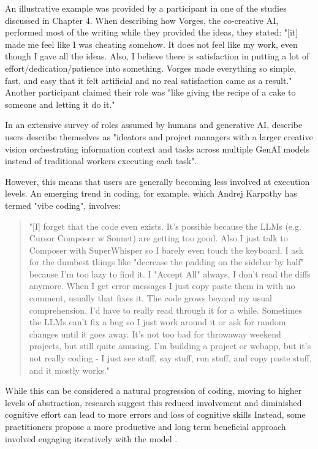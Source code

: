 An illustrative example was provided by a participant in one of the studies discussed in Chapter 4. When describing how Vorges, the co-creative AI, performed most of the writing while they provided the ideas, they stated: "[it] made me feel like I was cheating somehow. It does not feel like my work, even though I gave all the ideas. Also, I believe there is satisfaction in putting a lot of effort/dedication/patience into something. Vorges made everything so simple, fast, and easy that it felt artificial and no real satisfaction came as a result." Another participant claimed their role was "like giving the recipe of a cake to someone and letting it do it."


In an extensive survey of roles assumed by humans and generative AI, \cite{Palani2024-on} describe users describe themselves as "ideators and project managers with a larger creative vision orchestrating information context and tasks across multiple GenAI models instead of traditional workers executing each task". 

However, this means that users are generally becoming less involved at execution levels. An emerging trend in coding, for example, which Andrej Karpathy has termed "vibe coding", involves: 

\begin{quote}
"[I] forget that the code even exists. It's possible because the LLMs (e.g. Cursor Composer w Sonnet) are getting too good. Also I just talk to Composer with SuperWhisper so I barely even touch the keyboard. I ask for the dumbest things like "decrease the padding on the sidebar by half" because I'm too lazy to find it. I "Accept All" always, I don't read the diffs anymore. When I get error messages I just copy paste them in with no comment, usually that fixes it. The code grows beyond my usual comprehension, I'd have to really read through it for a while. Sometimes the LLMs can't fix a bug so I just work around it or ask for random changes until it goes away. It's not too bad for throwaway weekend projects, but still quite amusing. I'm building a project or webapp, but it's not really coding - I just see stuff, say stuff, run stuff, and copy paste stuff, and it mostly works."
\end{quote}

While this can be considered a natural progression of coding, moving to higher levels of abstraction, research suggest this reduced involvement and diminished cognitive effort can lead to more errors and loss of cognitive skills \cite{Lee2025-dwL} Instead, some practitioners propose a more productive and long term beneficial approach involved engaging iteratively with the model \cite{Osmani2024-br}. 

